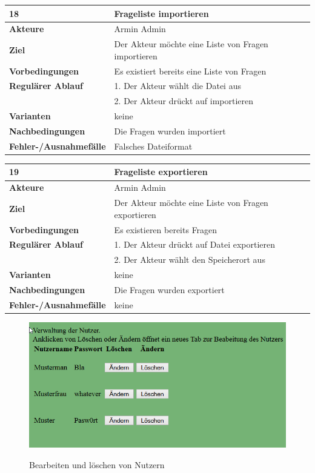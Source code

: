 \documentclass[fontsize=12pt,paper=a4,twoside]{scrartcl}
\begin{document}
\begin{table}
	[H] \label{18} 
	\begin{tabular}
		{|l|p{10cm}|} \hline \textbf{18} & \textbf{Frageliste importieren} \\
		\hline \textbf{Akteure} & Armin Admin\\
		\hline \textbf{Ziel} & Der Akteur möchte eine Liste von Fragen importieren\\
		\hline \textbf{Vorbedingungen} & Es existiert bereits eine Liste von Fragen\\
		\hline \textbf{Regulärer Ablauf} & 1. Der Akteur wählt die Datei aus\\
		&2. Der Akteur drückt auf importieren\\
		\hline \textbf{Varianten} & keine \\
		\hline \textbf{Nachbedingungen} & Die Fragen wurden importiert\\
		\hline \textbf{Fehler-/Ausnahmefälle} & Falsches Dateiformat\\
		\hline 
	\end{tabular}
\end{table}


\begin{table}
	[H] \label{19} 
	\begin{tabular}
		{|l|p{10cm}|} \hline \textbf{19} & \textbf{Frageliste exportieren} \\
		\hline \textbf{Akteure} & Armin Admin\\
		\hline \textbf{Ziel} & Der Akteur möchte eine Liste von Fragen exportieren\\
		\hline \textbf{Vorbedingungen} & Es existieren bereits Fragen\\
		\hline \textbf{Regulärer Ablauf} & 1. Der Akteur drückt auf Datei exportieren\\
		&2. Der Akteur wählt den Speicherort aus\\
		\hline \textbf{Varianten} & keine \\
		\hline \textbf{Nachbedingungen} & Die Fragen wurden exportiert\\
		\hline \textbf{Fehler-/Ausnahmefälle} & keine \\
		\hline 
	\end{tabular}
\end{table}



\begin{figure}
	[H] \caption{Bearbeiten und löschen von Nutzern} 
	\includegraphics[width=0.6
	\textwidth]{Bilder/WebseiteNutzer.png} \label{pic:ques} 
\end{figure}
\end{document}
